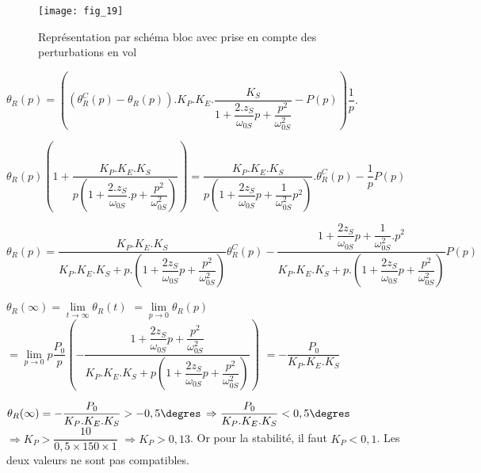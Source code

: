 \begin{figure}[H]
\centering
\texttt{[image: fig\_19]}
\caption{\label{fig_ccinppsi2022:19} Représentation par schéma bloc avec prise en compte des perturbations en vol}
\end{figure}
\fi


\ifprof
\begin{corrige}
$\theta_R (p)=\left(\left( \theta_R^C (p)-\theta_R (p)\right) .K_P.K_E.\dfrac{K_S}{1+\dfrac{2.z_S}{\omega_{0S}} p+\dfrac{p^2}{\omega_{0S}^2} }-P(p)\right) \dfrac{1}{p}$.

$\theta_R (p) \left(1+\dfrac{K_P.K_E.K_S}{p\left(1+\dfrac{2.z_S}{\omega_{0S}} .p+\dfrac{p^2}{\omega_{0S}^2} \right) }\right)= \dfrac{K_P.K_E.K_S}{p\left(1+\dfrac{2 z_S}{\omega_{0S}}p+\dfrac{1}{\omega_{0S}^2} p^2 \right) }.\theta_R^C (p)-\dfrac{1}{p} P(p)$

$\theta_R (p)
= \dfrac{K_P.K_E.K_S}{K_P.K_E.K_S+p.\left(1+\dfrac{2 z_S}{\omega_{0S}}p+\dfrac{p^2}{\omega_{0S}^2} \right)}\theta_R^C (p)
-\dfrac{1+\dfrac{2z_S}{\omega_{0S}}p+\dfrac{1}{\omega_{0S}^2}.p^2}{K_P.K_E.K_S+p.\left(1+\dfrac{2z_S}{\omega_{0S}}p+\dfrac{p^2}{\omega_{0S}^2} \right)}P(p)$

\end{corrige}
\else
\fi

\ifprof
\begin{corrige}
$\theta_R(\infty)=\lim\limits_{t \to \infty}  \theta_R (t) $
$=\lim\limits_{p \to 0}  \theta_R (p)$
$=\lim\limits_{p \to 0} p \dfrac{P_0}{p} \left (-\dfrac{1+\dfrac{2 z_S}{\omega_{0S}}p+\dfrac{p^2}{\omega_{0S}^2}}{K_P.K_E.K_S+p\left(1+\dfrac{2 z_S}{\omega_{0S}}p+\dfrac{p^2}{\omega_{0S}^2}\right)} \right) $
$=-\dfrac{P_0}{K_P.K_E.K_S}$
\end{corrige}
\else
\fi

\ifprof
\begin{corrige}
$\theta_R(\infty)=-\dfrac{P_0}{K_P.K_E.K_S }>-0,5\degres$ 
$\Rightarrow \dfrac{P_0}{K_P.K_E.K_S }<0,5\degres$
$\Rightarrow K_P>\dfrac{10}{0,5\times 150\times 1}$
$\Rightarrow K_P>0,13$.
Or pour la stabilité, il faut $K_P<0,1$. Les deux valeurs ne sont pas compatibles.

\end{corrige}
\else
\fi

